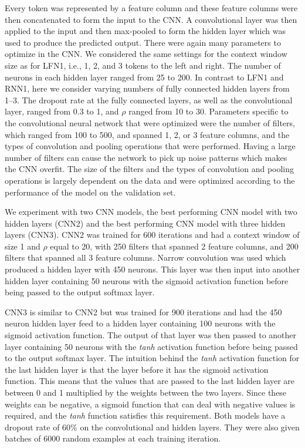 \documentclass[11pt,a4paper]{article}
\begin{document}
Every token was represented by a feature column and these feature
columns were then concatenated to form the input to the CNN. A
convolutional layer was then applied to the input and then max-pooled
to form the hidden layer which was used to produce the predicted
output. There were again many parameters to optimize in the CNN. We
considered the same settings for the context window size as for LFN1,
i.e., 1, 2, and 3 tokens to the left and right. The number of neurons
in each hidden layer ranged from 25 to 200. In contrast to LFN1 and
RNN1, here we consider varying numbers of fully connected hidden
layers from 1--3. The dropout rate at the fully connected layers, as
well as the convolutional layer, ranged from 0.3 to 1, and $\rho$
ranged from 10 to 30. Parameters specific to the convolutional neural
network that were optimized were the number of filters, which ranged
from 100 to 500, and spanned 1, 2, or 3 feature columns, and the types
of convolution and pooling operations that were performed. Having a
large number of filters can cause the network to pick up noise
patterns which makes the CNN overfit. The size of the filters and the
types of convolution and pooling operations is largely dependent on
the data and were optimized according to the performance of the model
on the validation set.

We experiment with two CNN models, the best performing CNN model with
two hidden layers (CNN2) and the best performing CNN model with three
hidden layers (CNN3). CNN2 was trained for 600 iterations and had a
context window of size 1 and $\rho$ equal to 20, with 250 filters that
spanned 2 feature columns, and 200 filters that spanned all 3 feature
columns. Narrow convolution was used which produced a hidden layer
with 450 neurons. This layer was then input into another hidden layer
containing 50 neurons with the sigmoid activation function before
being passed to the output softmax layer.

\pagebreak

CNN3 is similar to CNN2 but was trained for 900 iterations and had the
450 neuron hidden layer feed to a hidden layer containing 100 neurons
with the sigmoid activation function. The output of that layer was
then passed to another layer containing 50 neurons with the \textit{tanh}
activation function before being passed to the output softmax
layer. The intuition behind the \textit{tanh} activation function for the last
hidden layer is that the layer before it has the sigmoid activation
function. This means that the values that are passed to the last
hidden layer are between 0 and 1 multiplied by the weights between the
two layers. Since these weights can be negative, a sigmoid function
that can deal with negative values is required, and the \textit{tanh} function
satisfies this requirement. Both models have a dropout rate of 60\% on
the convolutional and hidden layers. They were also given batches of
6000 random examples at each training iteration.
\end{document}
